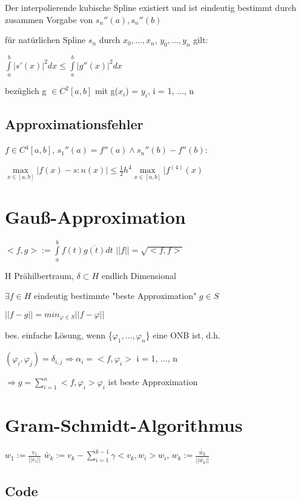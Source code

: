 \documentclass[12pt,a4paper]{article} %
\newcommand*\conj[1]{\overline{#1}}
\newcommand*\tab[1][1cm]{\hspace*{#1}}
\begin{document}
	Der interpolierende kubische Spline existiert und ist eindeutig bestimmt durch zusammen Vorgabe von $s_n''(a), s_n''(b)$
	
	für natürlichen Spline $s_n$ durch $x_0, ..., x_n$, $y_0, ..., y_n$ gilt:
	
	\tab $\int\limits_{a}^{b}|s'(x)|^2dx \le \int\limits_{a}^{b}|g''(x)|^2dx$
	
	bezüglich g $\in C^2[a, b]$ mit g($x_i$) = $y_i$, i = 1, ..., n
	
	\subsection{Approximationsfehler}
	
	$f \in C^4[a, b]$, $s_1''(a) = f''(a) \wedge s_n''(b) - f''(b)$:
	
	$\max\limits_{x \in [a, b]}|f(x) - s:n(x)| \le \frac{1}{2}h^4 \max\limits_{x \in [a, b]}|f^{(4)}(x)$
	
	\newpage
	
	\section{Gauß-Approximation}
	
	$<f, g>:= \int\limits_{a}^{b}f(t)\conj{g(t)}dt$ \tab $||f|| = \sqrt{<f, f>}$
	
	H Prähilbertraum, $\delta \subset H$ endlich Dimensional
	
	$\exists f \in H$ eindeutig bestimmte "beste Approximation" $g \in S$
	
	\tab $||f - g|| = min_{\varphi \in S}||f - \varphi||$
	
	bes. einfache Lösung, wenn \{$\varphi_1, ..., \varphi_n$\} eine ONB ist, d.h.
	
	$(\varphi_i, \varphi_j) = \delta_{i, j} \Rightarrow \alpha_i = <f, \varphi_i>$ \tab i = 1, ..., n
	
	\tab $\Rightarrow g = \sum\limits_{i = 1}^{n}<f, \varphi_i>\varphi_i$ ist beste Approximation
	
	\newpage
	
	\section{Gram-Schmidt-Algorithmus}
	
	$w_1 := \frac{v_1}{||v_1||}$ \space $\tilde{w_k}:=v_k - \sum\limits_{i = 1}^{k - 1}\gamma<v_k, w_i>w_i$, \space $w_k := \frac{\tilde{w_k}}{||\tilde{w_k}||}$
	
	\subsection{Code}
	
\end{document}
